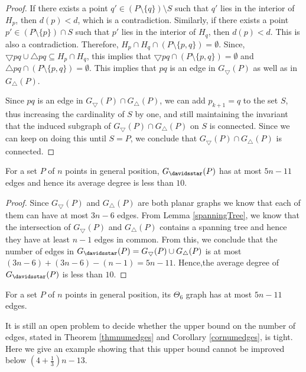 \begin{proof}
If there exists a point $q' \in (P \setminus \{q\}) \setminus S$ such that $q'$ lies in the interior of $H_p$, then $d(p)<d$, which is a 
contradiction. Similarly, if there exists a point $p' \in (P \setminus \{p\}) \cap S$ such that $p'$ lies in the interior of $H_q$, then $d(p)<d$. 
This is also a contradiction. Therefore, $H_p \cap H_q \cap (P \setminus \{p, q\}) = \emptyset$. 
Since, $\bigtriangledown pq \cup \bigtriangleup pq \subseteq H_p \cap H_q$, this implies that 
$\bigtriangledown pq \cap (P \setminus \{p, q\}) = \emptyset$ and $\bigtriangleup pq \cap (P \setminus \{p, q\}) = \emptyset$. 
This implies that $pq$ is an edge in $G_\bigtriangledown(P)$ as well as in $G_\bigtriangleup(P)$.

Since $pq$ is an edge in $G_\bigtriangledown(P) \cap G_\bigtriangleup(P)$, we can add $p_{k+1}=q$ to the set $S$, thus increasing 
the cardinality of $S$ by one, and still maintaining the invariant that the induced subgraph of $G_\bigtriangledown(P) \cap G_\bigtriangleup(P)$ on 
$S$ is connected. Since we can keep on doing this until $S=P$, we conclude that $G_\bigtriangledown(P) \cap G_\bigtriangleup(P)$ is connected. 
\end{proof}
\begin{theorem}\label{thmnumedges}
  For a set $P$ of $n$ points in general position, $G_{\davidsstar}(P)$ has at most $5n-11$ edges and hence its average degree is less than $10$.
\end{theorem}
\begin{proof}
Since $G_{\bigtriangledown}(P)$ and $G_{\bigtriangleup}(P)$ are both planar graphs we know that each of them can have at most $3 n-6$ edges. 
From Lemma \ref{spanningTree}, we know that the intersection of $G_{\bigtriangledown}(P)$ and $G_{\bigtriangleup}(P)$ contains a spanning 
tree and hence they have at least $n-1$ edges in common. From this, we conclude that the number of edges 
in $G_{\davidsstar}(P) = G_\bigtriangledown(P) \cup G_\bigtriangleup(P)$ is at most $(3n-6) +(3n-6) -(n-1) = 5n-11$. 
Hence,the average degree of $G_{\davidsstar}(P)$ is less than $10$.
\end{proof}
\begin{corollary}\label{cornumedges}
 For a set $P$ of $n$ points in general position, its $\Theta_6$ graph has at most $5n-11$ edges.
\end{corollary}
It is still an open problem to decide whether the upper bound on the number of edges, stated in Theorem \ref{thmnumedges} and 
Corollary \ref{cornumedges}, is tight. Here we give an example showing that this upper bound cannot be improved below $\left(4+\frac{1}{3}\right)n-13$. 
